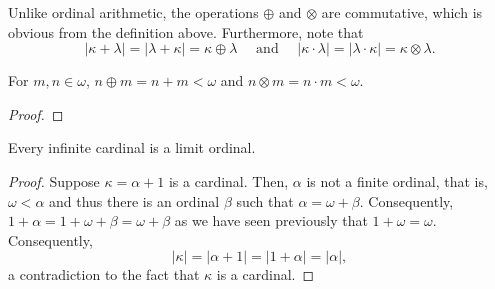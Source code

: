 Unlike ordinal arithmetic, the operations $\oplus$ and $\otimes$ are commutative, which is obvious from the definition above. Furthermore, note that 
\begin{equation*}
    |\kappa + \lambda| = |\lambda + \kappa| = \kappa\oplus\lambda\quad\text{ and }\quad|\kappa\cdot\lambda| = |\lambda\cdot\kappa| = \kappa\otimes\lambda.
\end{equation*}

\begin{lemma}
    For $m,n\in\omega$, $n\oplus m = n + m < \omega$ and $n\otimes m = n\cdot m < \omega$.
\end{lemma}
\begin{proof}
    
\end{proof}

\begin{proposition}
    Every infinite cardinal is a limit ordinal.
\end{proposition}
\begin{proof}
    Suppose $\kappa = \alpha + 1$ is a cardinal. Then, $\alpha$ is not a finite ordinal, that is, $\omega < \alpha$ and thus there is an ordinal $\beta$ such that $\alpha = \omega + \beta$. Consequently, $1 + \alpha = 1 + \omega + \beta = \omega + \beta$ as we have seen previously that $1 + \omega = \omega$. Consequently, 
    \begin{equation*}
        |\kappa| = |\alpha + 1| = |1 + \alpha| = |\alpha|,
    \end{equation*}
    a contradiction to the fact that $\kappa$ is a cardinal.
\end{proof}

